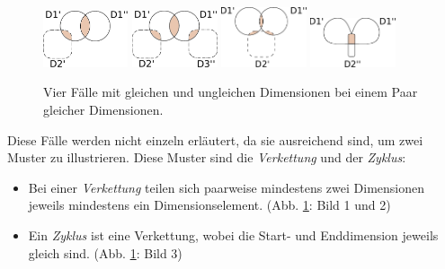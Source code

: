 \documentclass[11pt]{article}
\newcommand{\com}[1]{\marginpar{\em {\small{#1}}}} %
\begin{document}
\begin{figure}[!htb]
%
\centering
  \includegraphics[width=2.5cm]{CaseDifferentiation/CaseDifferentiation_1SameDim_SomeDePairPartnered_ConnUnequalDimDiffDS.pdf}
  \label{}
\endminipage
{}%
\centering
  \includegraphics[width=2.5cm]{CaseDifferentiation/CaseDifferentiation_1SameDim_SomeDePairPartnered_ConnEqualUnequalDim.pdf}
  \label{}
\endminipage
{}%
\centering
  \includegraphics[width=2.5cm]{CaseDifferentiation/CaseDifferentiation_1SameDim_SomeDePairPartnered_UnequalDimConnectBoth.pdf}
  \label{}
\endminipage
{}%
\centering
  \includegraphics[width=2.5cm]{CaseDifferentiation/CaseDifferentiation_1SameDimAnd1Diff_AllDimSameDE.pdf}
  \label{}
\endminipage
\caption{Vier Fälle mit gleichen und ungleichen Dimensionen bei einem Paar gleicher Dimensionen.}
\label{fig:4BasicCases_1DimEqual_4ExtCases}
\end{figure}

\noindent
Diese Fälle werden nicht einzeln erläutert, da sie ausreichend sind, um zwei Muster zu illustrieren. Diese Muster sind die \textit{Verkettung} und der \textit{Zyklus}:

\begin{itemize}
    \item Bei einer \emph{Verkettung}\com{Verkettung} teilen sich paarweise mindestens zwei Dimensionen jeweils mindestens ein Dimensionselement. (Abb. \ref{fig:4BasicCases_1DimEqual_4ExtCases}: Bild 1 und 2)
    \item Ein \emph{Zyklus}\com{Zyklus} ist eine Verkettung, wobei die Start- und Enddimension jeweils gleich sind. (Abb. \ref{fig:4BasicCases_1DimEqual_4ExtCases}: Bild 3)
\end{itemize}
\end{document}
